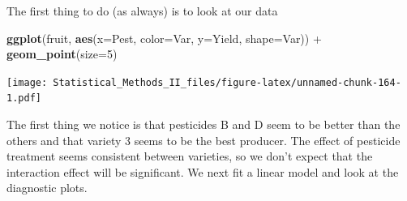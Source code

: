 \documentclass[]{book}
\newenvironment{Shaded}{\begin{snugshade}}{\end{snugshade}}
\newcommand{\KeywordTok}[1]{\textcolor[rgb]{0.13,0.29,0.53}{\textbf{{#1}}}}
\newcommand{\DataTypeTok}[1]{\textcolor[rgb]{0.13,0.29,0.53}{{#1}}}
\newcommand{\DecValTok}[1]{\textcolor[rgb]{0.00,0.00,0.81}{{#1}}}
\newcommand{\StringTok}[1]{\textcolor[rgb]{0.31,0.60,0.02}{{#1}}}
\newcommand{\CommentTok}[1]{\textcolor[rgb]{0.56,0.35,0.01}{\textit{{#1}}}}
\newcommand{\NormalTok}[1]{{#1}}
\theoremstyle{definition}
\theoremstyle{definition}
\theoremstyle{remark}
\begin{document}
\begin{Shaded}
\end{Shaded}

The first thing to do (as always) is to look at our data

\begin{Shaded}
\begin{Highlighting}[]
\KeywordTok{ggplot}\NormalTok{(fruit, }\KeywordTok{aes}\NormalTok{(}\DataTypeTok{x=}\NormalTok{Pest, }\DataTypeTok{color=}\NormalTok{Var, }\DataTypeTok{y=}\NormalTok{Yield, }\DataTypeTok{shape=}\NormalTok{Var)) +}\StringTok{ }
\StringTok{    }\KeywordTok{geom_point}\NormalTok{(}\DataTypeTok{size=}\DecValTok{5}\NormalTok{) }
\end{Highlighting}
\end{Shaded}

\texttt{[image: Statistical\_Methods\_II\_files/figure-latex/unnamed-chunk-164-1.pdf]}

The first thing we notice is that pesticides B and D seem to be better
than the others and that variety 3 seems to be the best producer. The
effect of pesticide treatment seems consistent between varieties, so we
don't expect that the interaction effect will be significant. We next
fit a linear model and look at the diagnostic plots.
\end{document}
